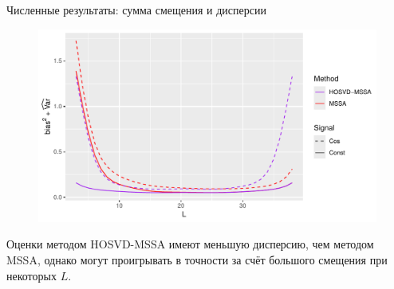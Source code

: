 \documentclass[pdf, unicode, 9pt, notheorems, handout]{beamer}
\begin{document}
    \begin{frame}{Численные результаты: сумма смещения и дисперсии}
        \begin{figure}
            \centering
            \includegraphics[width=\textwidth]{./img/approx_sep_large_noise_mse}
        \end{figure}
        Оценки методом HOSVD-MSSA имеют меньшую дисперсию, чем методом MSSA, однако могут проигрывать в точности за счёт
        большого смещения при некоторых $L$.
    \end{frame}
    
\end{document}
